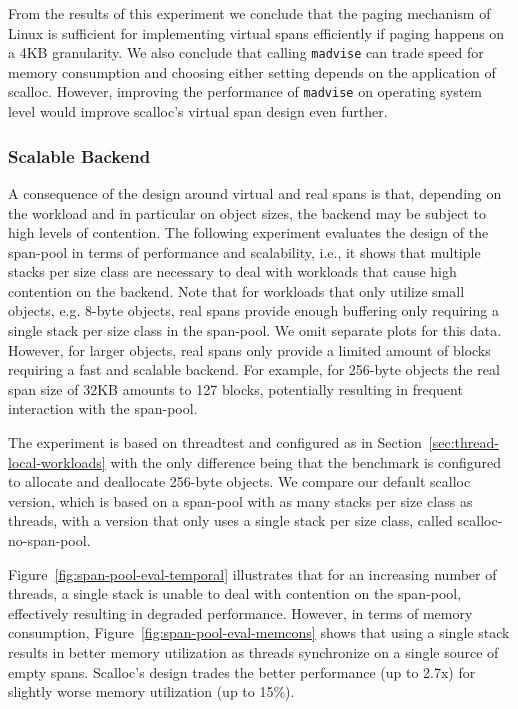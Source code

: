 \documentclass[10pt]{sigplanconf}
\newcommand{\impl}[1]{{\tt #1}\xspace}
\begin{document}
From the results of this experiment we conclude that the paging mechanism  of
Linux is sufficient for implementing virtual spans efficiently if paging
happens on a 4KB granularity. We also conclude that calling  \impl{madvise}
can trade speed for memory consumption and choosing either setting depends on
the application of scalloc. However, improving the performance of
\impl{madvise} on operating system level would improve scalloc's virtual span design
even further.

\subsubsection*{Scalable Backend}

A consequence of the design around virtual and real spans is that, depending
on the workload and in particular on object sizes, the backend may be subject to
high levels of contention. The following experiment evaluates the design of
the span-pool in terms of performance and scalability, i.e., it shows that
multiple stacks per size class are necessary to deal  with workloads that
cause high contention on the backend. Note that for workloads that only
utilize small objects,  e.g. 8-byte objects, real spans provide enough buffering only
requiring a single stack per size class in the span-pool. We omit separate
plots for this data. However, for larger objects, real spans only provide
a limited amount of blocks requiring a fast and scalable backend. For example, for
256-byte objects the real span size of 32KB amounts to 127 blocks, potentially
resulting in frequent interaction with the span-pool.

The experiment is based on threadtest and configured as in
Section~\ref{sec:thread-local-workloads} with the only difference being that the
benchmark is configured to allocate and deallocate 256-byte objects. We compare
our default scalloc version,
which is based on a span-pool with as many stacks per size
class as threads, with a version that only uses a single stack per size
class, called scalloc-no-span-pool.

Figure~\ref{fig:span-pool-eval-temporal} illustrates that for an increasing
number of threads, a single stack is unable to deal with contention on the
span-pool, effectively resulting in degraded performance. However, in terms of
memory consumption, Figure~\ref{fig:span-pool-eval-memcons} shows that using a
single stack results in better memory utilization as threads synchronize on
a single source of empty spans. Scalloc's design trades the better performance (up to
2.7x) for slightly worse memory utilization (up to 15\%).
\end{document}
